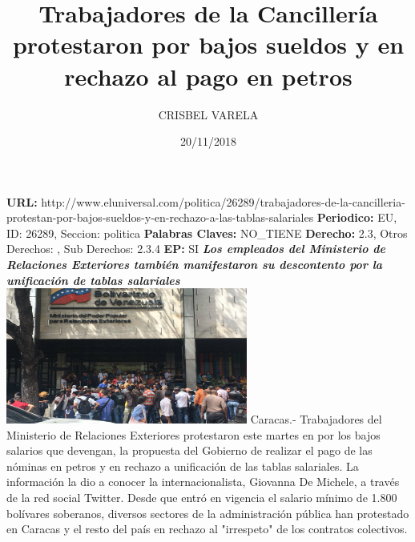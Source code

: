 \documentclass{article}%
\title{\textbf{Trabajadores de la Cancillería protestaron por bajos sueldos y en rechazo al pago en petros}}%
\author{CRISBEL VARELA}%
\date{20/11/2018}%
\begin{document}
%
\normalsize%
\maketitle%
\textbf{URL: }%
http://www.eluniversal.com/politica/26289/trabajadores{-}de{-}la{-}cancilleria{-}protestan{-}por{-}bajos{-}sueldos{-}y{-}en{-}rechazo{-}a{-}las{-}tablas{-}salariales\newline%
%
\textbf{Periodico: }%
EU, %
ID: %
26289, %
Seccion: %
politica\newline%
%
\textbf{Palabras Claves: }%
NO\_TIENE\newline%
%
\textbf{Derecho: }%
2.3, %
Otros Derechos: %
, %
Sub Derechos: %
2.3.4\newline%
%
\textbf{EP: }%
SI\newline%
\newline%
%
\textbf{\textit{Los empleados del Ministerio de Relaciones Exteriores también manifestaron su descontento por la unificación de tablas salariales}}%
\newline%
\newline%
%
\includegraphics[width=300px]{206.jpg}%
\newline%
%
Caracas.{-} Trabajadores del Ministerio de Relaciones Exteriores protestaron este martes en por los bajos salarios que devengan, la propuesta del Gobierno de realizar el pago de las nóminas en petros y en rechazo a unificación de las tablas salariales.%
\newline%
%
La información la dio a conocer la internacionalista, Giovanna De Michele, a través de la red social Twitter.%
\newline%
%
Desde que entró en vigencia el salario mínimo de 1.800 bolívares soberanos, diversos sectores de la administración pública han protestado en Caracas y el resto del país en rechazo al "irrespeto" de los contratos colectivos.%
\newline%
%
\end{document}
